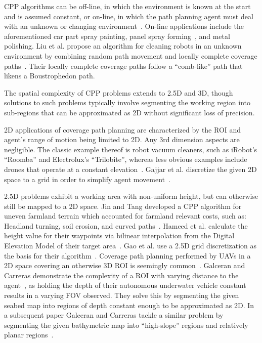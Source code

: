 CPP algorithms can be off-line, in which the environment is known at the start and is assumed constant, or on-line, in which the path planning agent must deal with an unknown or changing environment~\cite{CPP_survey_for_robotics}.
On-line applications include the aforementioned car part spray painting, panel spray forming~\cite{Robotic_grc_spraying}, and metal polishing.
Liu et al. propose an algorithm for cleaning robots in an unknown environment by combining random path movement and locally complete coverage paths~\cite{CCPP_cleaning_robots}.
Their locally complete coverage paths follow a ``comb-like'' path that likens a Boustrophedon path.

The spatial complexity of CPP problems extends to 2.5D and 3D, though solutions to such problems typically involve segmenting the working region into sub-regions that can be approximated as 2D without significant loss of precision.

2D applications of coverage path planning are characterized by the ROI and agent's range of motion being limited to 2D.
Any 3rd dimension aspects are negligible.
The classic example thereof is robot vacuum cleaners, such as iRobot's ``Roomba'' and Electrolux's ``Trilobite''\cite{CCPP_cleaning_robots}, whereas less obvious examples include drones that operate at a constant elevation~\cite{CPP_2D_convex_regions_uav}.
Gajjar et al. discretize the given 2D space to a grid in order to simplify agent movement~\cite{CCPP_known_2D_env}.

2.5D problems exhibit a working area with non-uniform height, but can otherwise still be mapped to a 2D space.
Jin and Tang developed a CPP algorithm for uneven farmland terrain which accounted for farmland relevant costs, such as: Headland turning, soil erosion, and curved paths~\cite{CPP_farming_terrain}.
Hameed et al. calculate the height value for their waypoints via bilinear interpolation from the Digital Elevation Model of their target area~\cite{CPP_2.5D_agriculture}.
Gao et al. use a 2.5D grid discretization as the basis for their algorithm~\cite{CPP_2.5D_grid_map}.
Coverage path planning performed by UAVs in a 2D space covering an otherwise 3D ROI is seemingly common~\cite{CPP_2.5D_SAA_grid_based_UAV_3D_recons, CPP_2.5D_UAV_3D_terrain_recons, CPP_multi_UAV, CPP_2D_convex_regions_uav}.
Galceran and Carreras demonstrate the complexity of a ROI with varying distance to the agent~\cite{CPP_2.5D_seabed_2012}, as holding the depth of their autonomous underwater vehicle constant results in a varying FOV observed.
They solve this by segmenting the given seabed map into regions of depth constant enough to be approximated as 2D.
In a subsequent paper Galceran and Carreras tackle a similar problem by segmenting the given bathymetric map into ``high-slope'' regions and relatively planar regions~\cite{CPP_2.5D_seabed_2013}.


